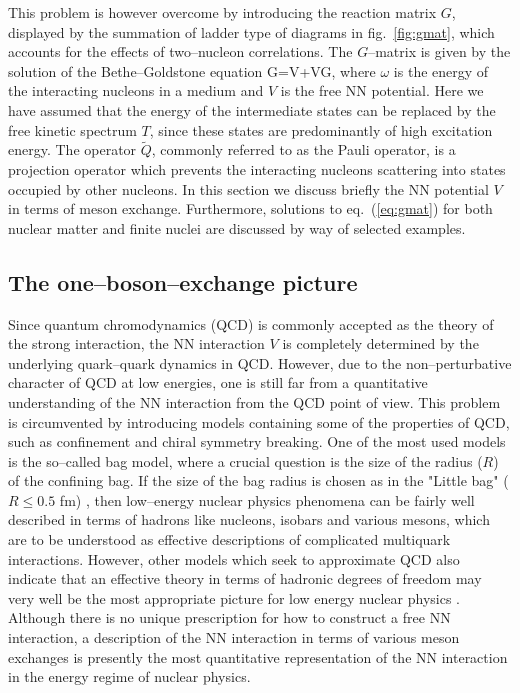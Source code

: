 This problem is however overcome by
introducing the reaction matrix $G$, displayed by  the summation
of ladder type of diagrams in fig.\ \ref{fig:gmat}, which accounts for the
effects of two--nucleon correlations. The $G$--matrix is
given by the solution
of the Bethe--Goldstone equation
\be
G=V+VG,
\label{eq:gmat}
\ee
where $\omega$ is the energy of the interacting nucleons in
a medium and $V$ is the free NN potential.
Here we have assumed that the energy of the intermediate
states can be replaced by the free kinetic spectrum $T$, since
these states are predominantly of high excitation energy.
The operator $\tilde{Q}$,
commonly referred to as the Pauli operator, is a projection
operator which prevents the interacting nucleons scattering into
states occupied by other nucleons.
In this section we discuss briefly the NN potential $V$
in terms of meson exchange. Furthermore, solutions to eq.\ (\ref{eq:gmat}) for
both nuclear matter and finite nuclei are discussed by way of selected
examples.

\subsection{The one--boson--exchange picture}
Since quantum chromodynamics (QCD) is commonly
accepted as the theory of the strong interaction, the
NN interaction $V$ is completely determined by the underlying
quark--quark dynamics in QCD. However, due to the non--perturbative
character of QCD at low energies, one is still far from a
quantitative understanding of the NN interaction from the QCD point of
view. This problem is circumvented by introducing
models containing some of the properties of QCD, such as
confinement and chiral symmetry breaking. One of the most used models
is the so--called bag model, where a crucial question is the
size of the radius ($R$) of the confining bag. If the size of the bag radius
is chosen as in the "Little bag" ($R\leq 0.5$ fm) \cite{br79}, then
low--energy nuclear physics phenomena can be fairly well described
in terms of hadrons like nucleons, isobars and various mesons,
which are to be understood as effective descriptions of complicated
multiquark interactions.
However, other models which
seek to approximate QCD also indicate that an effective theory in terms
of hadronic degrees of freedom may very well be the most appropriate
picture for low energy nuclear physics \cite{zahed88}.
Although there is no unique prescription for how to construct
a free NN interaction, a description
of the NN interaction in terms of various meson exchanges is presently
the most quantitative representation of the NN interaction
\cite{mac89,mes79}
in the energy regime of nuclear physics.

